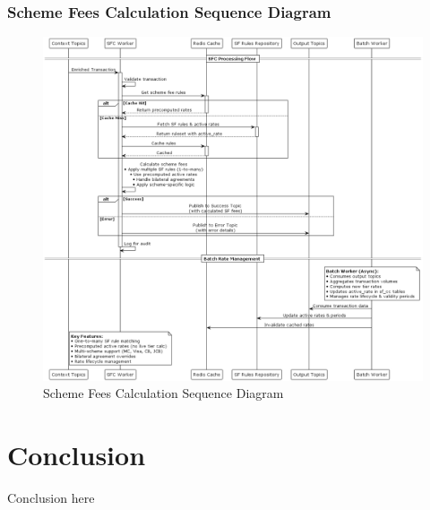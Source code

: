 \subsubsection{Scheme Fees Calculation Sequence Diagram}
\begin{figure}[H]
    \centering
    \includegraphics[width=1.05\textwidth]{out/diagrams/plantuml/in/sf-sequence/P2S Scheme Fee Calculation Process.png}
    \caption{Scheme Fees Calculation Sequence Diagram}
    \label{fig:scheme_fees_calculation_sequence}
\end{figure}



\section{Conclusion}

Conclusion here